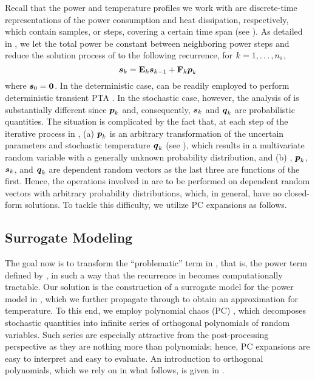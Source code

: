 Recall that the power and temperature profiles we work with are discrete-time
representations of the power consumption and heat dissipation, respectively,
which contain \ns samples, or steps, covering a certain time span (see
). As detailed in , we let the
total power be constant between neighboring power steps and reduce the solution
process of  to the following recurrence, for $k =
1, \dots, {n_\mathrm{s}}$,
\[
  \boldsymbol{s}_k = \mathbf{E}_k \boldsymbol{s}_{k - 1} + \mathbf{F}_k \boldsymbol{p}_k
\]
where $\boldsymbol{s}_0 = \boldsymbol{0}$. In the deterministic case,  can be
readily employed to perform deterministic transient PTA \cite{thiele2011,
ukhov2012}. In the stochastic case, however, the analysis of 
is substantially different since $\boldsymbol{p}_k$ and, consequently, $\boldsymbol{s}_k$ and $\boldsymbol{q}_k$
are probabilistic quantities. The situation is complicated by the fact that, at
each step of the iterative process in , (a) $\boldsymbol{p}_k$ is an
arbitrary transformation of the uncertain parameters \vu and stochastic
temperature $\boldsymbol{q}_k$ (see ), which results in a multivariate
random variable with a generally unknown probability distribution, and (b) \vu,
$\boldsymbol{p}_k$, $\boldsymbol{s}_k$, and $\boldsymbol{q}_k$ are dependent random vectors as the last three are
functions of the first. Hence, the operations involved in  are
to be performed on dependent random vectors with arbitrary probability
distributions, which, in general, have no closed-form solutions. To tackle this
difficulty, we utilize PC expansions as follows.

\subsection{Surrogate Modeling}

The goal now is to transform the ``problematic'' term in , that
is, the power term defined by , in such a way that the
recurrence in  becomes computationally tractable. Our solution
is the construction of a surrogate model for the power model in
, which we further propagate through  to
obtain an approximation for temperature. To this end, we employ polynomial chaos
(PC) \cite{xiu2010}, which decomposes stochastic quantities into infinite series
of orthogonal polynomials of random variables. Such series are especially
attractive from the post-processing perspective as they are nothing more than
polynomials; hence, PC expansions are easy to interpret and easy to evaluate. An
introduction to orthogonal polynomials, which we rely on in what follows, is
given in .

